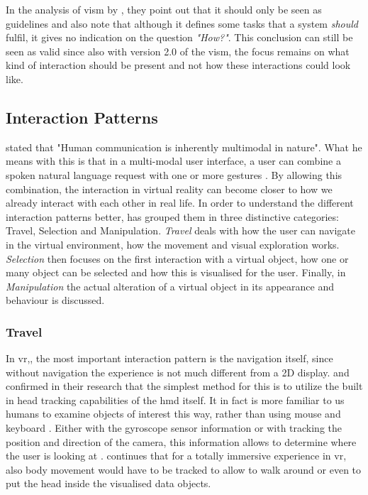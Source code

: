 In the analysis of \gls{vism} by \cite{Craft2005}, they point out that it should only be seen as guidelines and also note that although it defines some tasks that a system \textit{should} fulfil, it gives no indication on the question \textit{"How?"}. This conclusion can still be seen as valid since also with version 2.0 of the \gls{vism}, the focus remains on what kind of interaction should be present and not how these interactions could look like.



\subsection{Interaction Patterns}

\cite{Bunt1998} stated that "Human communication is inherently multimodal in nature". What he means with this is that in a multi-modal user interface, a user can combine a spoken natural language request with one or more gestures \citep{Rosson2002}. By allowing this combination, the interaction in virtual reality can become closer to how we already interact with each other in real life. \newline
In order to understand the different interaction patterns better, \cite{Bowman2002a} has grouped them in three distinctive categories: Travel, Selection and Manipulation. \textit{Travel} deals with how the user can navigate in the virtual environment, how the movement and visual exploration works. \textit{Selection} then focuses on the first interaction with a virtual object, how one or many object can be selected and how this is visualised for the user. Finally, in \textit{Manipulation} the actual alteration of a virtual object in its appearance and behaviour is discussed.



\subsubsection{Travel}

In \gls{vr},, the most important interaction pattern is the navigation itself, since without navigation the experience is not much different from a 2D display. \cite{Kwon2015} and  \cite{Jamieson2007} confirmed in their research that the simplest method for this is to utilize the built in head tracking capabilities of the \gls{hmd} itself. It in fact is more familiar to us humans to examine objects of interest this way, rather than using mouse and keyboard \citep{Jamieson2007}. Either with the gyroscope sensor information or with tracking the position and direction of the camera, this information allows to determine where the user is looking at \citep{Kwon2015}. \cite{Jamieson2007} continues that for a totally immersive experience in \gls{vr}, also body movement would have to be tracked to allow to walk around or even to put the head inside the visualised data objects.

